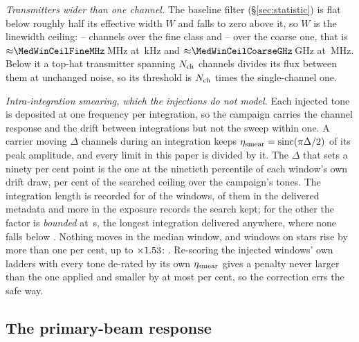\emph{Transmitters wider than one channel.} The baseline filter
(\S\ref{sec:statistic}) is flat below roughly half its effective width $W$ and
falls to zero above it, so $W$ is the linewidth ceiling:
\MedWinFineLo--\MedWinFineHi{} channels over the fine class and
\MedWinCoarseLo--\MedWinCoarseHi{} over the coarse one, that is
${\approx}\MedWinCeilFineMHz$\,MHz at \ChanFineKHz\,kHz and
${\approx}\MedWinCeilCoarseGHz$\,GHz at \ChanCoarseMHz\,MHz. Below it a
top-hat transmitter spanning $N_{\rm ch}$ channels divides its flux between
them at unchanged noise, so its threshold is $N_{\rm ch}$ times the
single-channel one.

\emph{Intra-integration smearing, which the injections do not model.} Each
injected tone is deposited at one frequency per integration, so the campaign
carries the channel response and the drift between integrations but not the
sweep within one. A carrier moving $\Delta$ channels during an integration
keeps $\eta_{\rm smear}=\mathrm{sinc}(\pi\Delta/2)$ of its peak amplitude, and
every limit in this paper is divided by it. The $\Delta$ that sets a ninety
per cent point is the one at the ninetieth percentile of each window's own
drift draw, \SmcQninePct{} per cent of the searched ceiling over the
campaign's \SmcNTone{} tones. The integration length is recorded for
\SmcNMeas{} of the \NWindows{} windows, \CsNDumpWin{} of them in the delivered
metadata and \SmNRecov{} more in the exposure records the search kept; for the
other \SmcNBound{} the factor is \emph{bounded} at \SmcDtCeil\,s, the longest
integration delivered anywhere, where none falls below \SmcBoundEta.
Nothing moves in the median window, and \SmcNAbove{} windows on
\SmcNAboveStar{} stars rise by more than one per cent, up to
$\times1.53$: \SmcAboveStars. Re-scoring the \SmcValNWin{} injected
windows' own ladders with every tone de-rated by its own $\eta_{\rm smear}$
gives a penalty never larger than the one applied and smaller by at most
\SmcValWorstPct{} per cent, so the correction errs the safe way.

\subsection{The primary-beam response}

